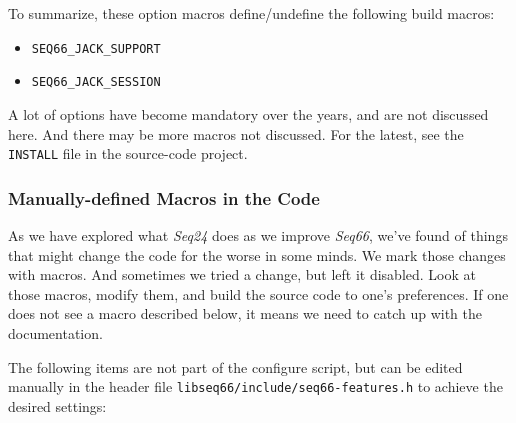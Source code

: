     To summarize, these option macros define/undefine the following build
    macros:

      \begin{itemize}
        \item \texttt{SEQ66\_JACK\_SUPPORT}
        \item \texttt{SEQ66\_JACK\_SESSION}
      \end{itemize}

   A lot of options have become mandatory over the years, and are not discussed
   here.  And there may be more macros not discussed.  For the latest, see the
   \texttt{INSTALL} file in the source-code project.

\subsubsection{Manually-defined Macros in the Code}
\label{subsubsec:build_macros}

   As we have explored what \textsl{Seq24} does as we improve
   \textsl{Seq66}, we've found of things that might change the code
   for the worse in some minds.
   We mark those changes with macros.
   And sometimes we tried a change, but left it disabled.
   Look at those macros, modify them, and build
   the source code to one's preferences.  If one does not see a macro described
   below, it means we need to catch up with the documentation.

   The following items are not part of the configure script, but can
   be edited manually in the header file
   \texttt{libseq66/include/seq66-features.h}
   to achieve the desired settings:

   \setcounter{ItemCounter}{0}      %
   
